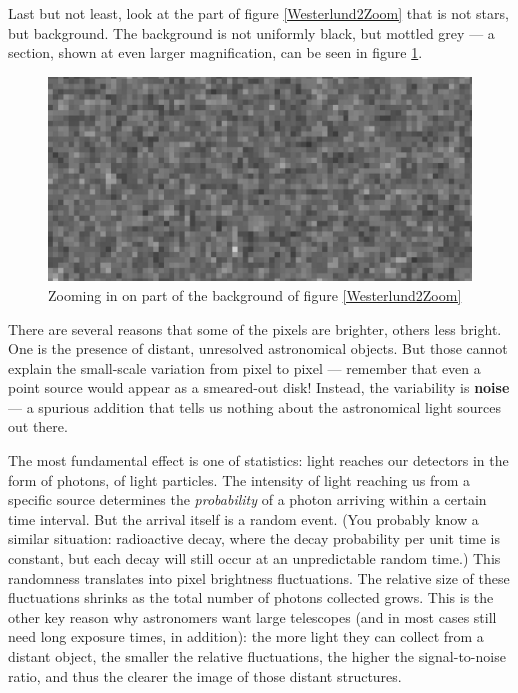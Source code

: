 \documentclass[twocolumn,apj]{openjournal}
\begin{document}
Last but not least, look at the part of figure \ref{Westerlund2Zoom} that is not stars, but background. The background is not uniformly black, but mottled grey --- a section, shown at even larger magnification, can be seen in figure \ref{Westerlund2bg}.
\begin{figure}[htbp]
\begin{center}
\includegraphics[width=\linewidth]{westerlund-bg.jpg}
\caption{Zooming in on part of the background of figure \ref{Westerlund2Zoom}}
\label{Westerlund2bg}
\end{center}
\end{figure}
There are several reasons that some of the pixels are brighter, others less bright. One is the presence of distant, unresolved astronomical objects. But those cannot explain the small-scale variation from pixel to pixel --- remember that even a point source would appear as a smeared-out disk! Instead, the variability is {\bf noise} --- a spurious addition that tells us nothing about the astronomical light sources out there. 

The most fundamental effect is one of statistics: light reaches our detectors in the form of photons, of light particles. The intensity of light reaching us from a specific source determines the {\em probability} of a photon arriving within a certain time interval. But the arrival itself is a random event. (You probably know a similar situation: radioactive decay, where the decay probability per unit time is constant, but each decay will still occur at an unpredictable random time.) This randomness translates into pixel brightness fluctuations. The relative size of these fluctuations shrinks as the total number of photons collected grows. This is the other key reason why astronomers want large telescopes (and in most cases still need long exposure times, in addition): the more light they can collect from a distant object, the smaller the relative fluctuations, the higher the signal-to-noise ratio, and thus the clearer the image of those distant structures.
\end{document}
